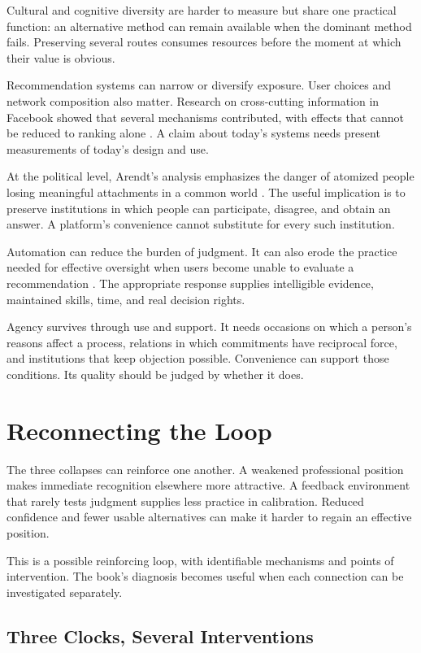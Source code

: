 \documentclass[11pt,openany]{book}
\begin{document}
Cultural and cognitive diversity are harder to measure but share one practical function: an alternative method can remain available when the dominant method fails. Preserving several routes consumes resources before the moment at which their value is obvious.

Recommendation systems can narrow or diversify exposure. User choices and network composition also matter. Research on cross-cutting information in Facebook showed that several mechanisms contributed, with effects that cannot be reduced to ranking alone \cite{bakshy2015exposure}. A claim about today's systems needs present measurements of today's design and use.

At the political level, Arendt's analysis emphasizes the danger of atomized people losing meaningful attachments in a common world \cite{arendt1951origins}. The useful implication is to preserve institutions in which people can participate, disagree, and obtain an answer. A platform's convenience cannot substitute for every such institution.

Automation can reduce the burden of judgment. It can also erode the practice needed for effective oversight when users become unable to evaluate a recommendation \cite{parasuraman1997humans}. The appropriate response supplies intelligible evidence, maintained skills, time, and real decision rights.

Agency survives through use and support. It needs occasions on which a person's reasons affect a process, relations in which commitments have reciprocal force, and institutions that keep objection possible. Convenience can support those conditions. Its quality should be judged by whether it does.

\section{Reconnecting the Loop}

The three collapses can reinforce one another. A weakened professional position makes immediate recognition elsewhere more attractive. A feedback environment that rarely tests judgment supplies less practice in calibration. Reduced confidence and fewer usable alternatives can make it harder to regain an effective position.

This is a possible reinforcing loop, with identifiable mechanisms and points of intervention. The book's diagnosis becomes useful when each connection can be investigated separately.

\subsection{Three Clocks, Several Interventions}
\end{document}
